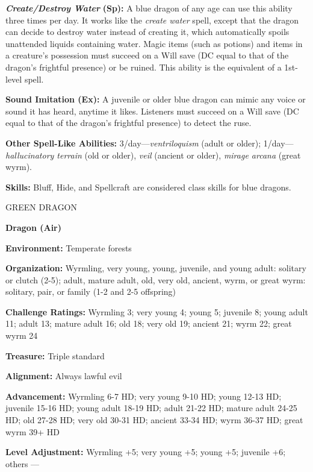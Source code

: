 \documentclass{article}
\begin{document}
\textit{\textbf{Create/Destroy Water }}\textbf{(Sp):} A blue dragon of any age 
can use this ability three times per day. It works like the \textit{create water 
}spell, except that the dragon can decide to destroy water instead of creating 
it, which automatically spoils unattended liquids containing water. Magic items 
(such as potions) and items in a creature's possession must succeed on a Will save 
(DC equal to that of the dragon's frightful presence) or be ruined. This ability 
is the equivalent of a 1st-level spell.

\textbf{Sound Imitation (Ex):} A juvenile or older blue dragon can mimic any voice 
or sound it has heard, anytime it likes. Listeners must succeed on a Will save 
(DC equal to that of the dragon's frightful presence) to detect the ruse.

\textbf{Other Spell-Like Abilities:} 3/day---\textit{ventriloquism }(adult or older); 
1/day---\textit{hallucinatory terrain }(old or older), \textit{veil }(ancient or 
older), \textit{mirage arcana }(great wyrm).

\textbf{Skills:} Bluff, Hide, and Spellcraft are considered class skills for blue 
dragons.

\vspace{12pt}
GREEN DRAGON

\textbf{Dragon (Air)}

\textbf{Environment: }Temperate forests

\textbf{Organization: }Wyrmling, very young, young, juvenile, and young adult: 
solitary or clutch (2-5); adult, mature adult, old, very old, ancient, wyrm, or 
great wyrm: solitary, pair, or family (1-2 and 2-5 offspring)

\textbf{Challenge Ratings: }Wyrmling 3; very young 4; young 5; juvenile 8; young 
adult 11; adult 13; mature adult 16; old 18; very old 19; ancient 21; wyrm 22; 
great wyrm 24

\textbf{Treasure: }Triple standard

\textbf{Alignment:} Always lawful evil

\textbf{Advancement:} Wyrmling 6-7 HD; very young 9-10 HD; young 12-13 HD; juvenile 
15-16 HD; young adult 18-19 HD; adult 21-22 HD; mature adult 24-25 HD; old 27-28 
HD; very old 30-31 HD; ancient 33-34 HD; wyrm 36-37 HD; great wyrm 39+ HD

\textbf{Level Adjustment: }Wyrmling +5; very young +5; young +5; juvenile +6; others 
---
\end{document}

